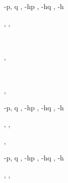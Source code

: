 \documentclass[a4paper]{article}
\begin{document}
\begin{alectryon}
\begin{sentence}
\begin{output}
\begin{goals}
        \begin{goal}
          \begin{hyps}
            \hyp{p, q}{}
            \sep
            \hyp{hp}{}
            \sep
            \hyp{hq}{}
            \sep
            \hyp{h}{~~}
          \end{hyps}
          \sep
          \sep
          \begin{conclusion}
            ~~
          \end{conclusion}
        \end{goal}
      \end{goals}
    \end{output}
  \end{sentence}
  \sep
  \begin{sentence}
    \begin{input}
      ~~~~~
    \end{input}
    \sep
    \begin{output}
      \begin{goals}
        \begin{goal}
          \begin{hyps}
            \hyp{p, q}{}
            \sep
            \hyp{hp}{}
            \sep
            \hyp{hq}{}
            \sep
            \hyp{h}{~~}
          \end{hyps}
          \sep
          \sep
          \begin{conclusion}
          \end{conclusion}
        \end{goal}
        \sep
        \begin{extragoals}
          \begin{goal}
            \begin{hyps}
              \hyp{p, q}{}
              \sep
              \hyp{hp}{}
              \sep
              \hyp{hq}{}
              \sep
              \hyp{h}{~~}
            \end{hyps}
            \sep
            \sep
            \begin{conclusion}
            \end{conclusion}

\end{goal}
\end{extragoals}
\end{goals}
\end{output}
\end{sentence}
\end{alectryon}
\end{document}
